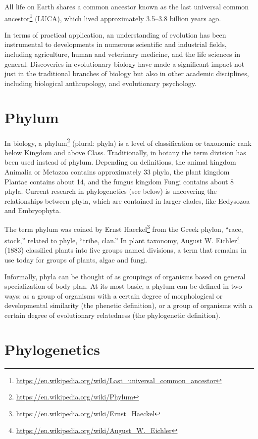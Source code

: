 \documentclass[]{book}
\let\rmarkdownfootnote\footnote%
\def\footnote{\protect\rmarkdownfootnote}
\renewcommand{\href}[2]{#2\footnote{\url{#1}}}
\theoremstyle{definition}
\theoremstyle{definition}
\theoremstyle{definition}
\theoremstyle{remark}
\begin{document}
All life on Earth shares a common ancestor known as the
\href{https://en.wikipedia.org/wiki/Last_universal_common_ancestor}{last
universal common ancestor} (LUCA), which lived approximately 3.5--3.8
billion years ago.

In terms of practical application, an understanding of evolution has
been instrumental to developments in numerous scientific and industrial
fields, including agriculture, human and veterinary medicine, and the
life sciences in general. Discoveries in evolutionary biology have made
a significant impact not just in the traditional branches of biology but
also in other academic disciplines, including biological anthropology,
and evolutionary psychology.

\section{Phylum}\label{phylum}

In biology, a \href{https://en.wikipedia.org/wiki/Phylum}{phylum}
(plural: phyla) is a level of classification or taxonomic rank below
Kingdom and above Class. Traditionally, in botany the term division has
been used instead of phylum. Depending on definitions, the animal
kingdom Animalia or Metazoa contains approximately 33 phyla, the plant
kingdom Plantae contains about 14, and the fungus kingdom Fungi contains
about 8 phyla. Current research in phylogenetics (see below) is
uncovering the relationships between phyla, which are contained in
larger clades, like Ecdysozoa and Embryophyta.

The term phylum was coined by \href{https://en.wikipedia.org/wiki/Ernst_Haeckel}{Ernst Haeckel} from the Greek phylon,
``race, stock,'' related to phyle, ``tribe, clan.'' In plant taxonomy,
\href{https://en.wikipedia.org/wiki/August_W._Eichler}{August W. Eichler} (1883) classified plants into five groups named
divisions, a term that remains in use today for groups of plants, algae
and fungi.

Informally, phyla can be thought of as groupings of organisms based on
general specialization of body plan. At its most basic, a phylum can be
defined in two ways: as a group of organisms with a certain degree of
morphological or developmental similarity (the phenetic definition), or
a group of organisms with a certain degree of evolutionary relatedness
(the phylogenetic definition).

\section{Phylogenetics}\label{phylogenetics}
\end{document}
